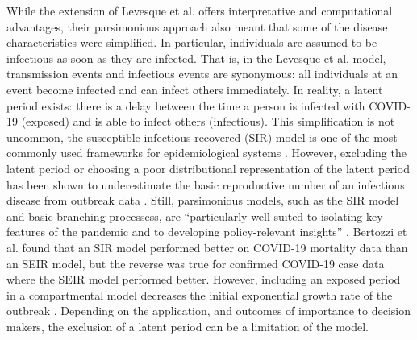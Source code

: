 \documentclass[sr]{drdc-report}
\begin{document}
 

While the extension of Levesque et al. offers interpretative and computational advantages, their parsimonious approach also meant that some of the disease characteristics were simplified. In particular, individuals are assumed to be infectious as soon as they are infected. That is, in the Levesque et al. model, transmission events and infectious events are synonymous: all individuals at an event become infected and can infect others immediately. In reality, a latent period exists: there is a delay between the time a person is infected with COVID-19 (exposed) and is able to infect others (infectious). This simplification is not uncommon, the susceptible-infectious-recovered (SIR) model is one of the most commonly used frameworks for epidemiological systems \cite{Wearing}. However, excluding the latent period or choosing a poor distributional representation of the latent period has been shown to underestimate the basic reproductive number of an infectious disease from outbreak data \cite{Wearing}. Still, parsimonious models, such as the SIR model and basic branching processess, are “particularly well suited to isolating key features of the pandemic and to developing policy-relevant insights” \cite{Bertozzi}. Bertozzi et al. \cite{Bertozzi} found that an SIR model performed better on COVID-19 mortality data than an SEIR model, but the reverse was true for confirmed COVID-19 case data where the SEIR model performed better. However, including an exposed period in a compartmental model decreases the initial exponential growth rate of the outbreak \cite{Brauer}. Depending on the application, and outcomes of importance to decision makers, the exclusion of a latent period can be a limitation of the model.  

 
\end{document}
